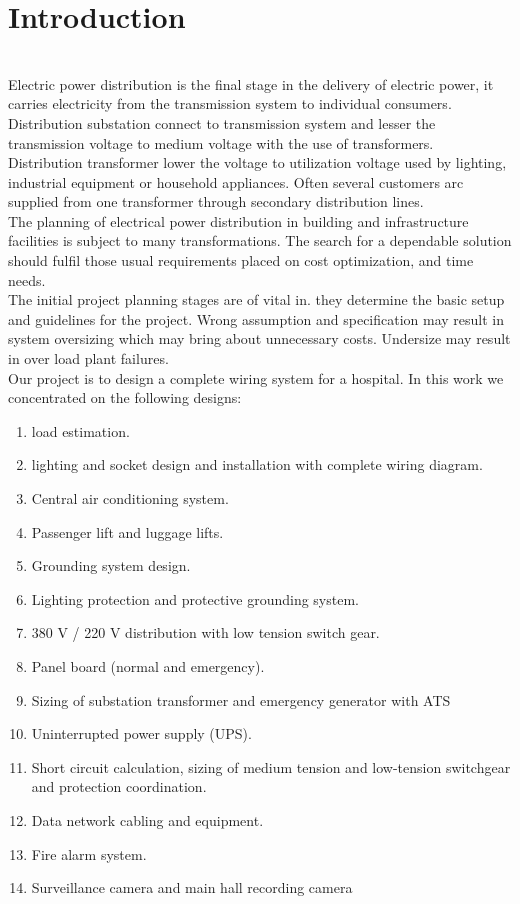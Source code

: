 \documentclass[12pt,fleqn]{book} %
\begin{document}
\section{Introduction}

\\ Electric power distribution is the final stage in the delivery of electric power, it carries electricity  from  the transmission  system  to  individual  consumers. Distribution  substation  connect  to  transmission system and lesser the transmission  voltage to medium voltage with the use of transformers.
\\ Distribution  transformer  lower  the  voltage  to utilization  voltage used by lighting, industrial  equipment  or  household appliances. Often several customers arc supplied from one transformer through secondary distribution lines.
\\ The planning   of  electrical  power distribution  in  building and infrastructure facilities is subject to many transformations. The search  for  a dependable  solution  should  fulfil those usual requirements placed on cost optimization, and time needs.
\\The initial project planning stages are of vital in. they determine the basic  setup  and  guidelines  for the project. Wrong assumption  and  specification  may result  in system  oversizing  which  may bring  about unnecessary costs. Undersize may result in over load plant failures.
\\Our project is to design a complete wiring system for a hospital. In this work  we concentrated on the following designs:
\begin{enumerate}
    \item load estimation.
    \item lighting and socket design and installation with complete wiring diagram.
    \item Central air conditioning system.
    \item Passenger lift and luggage lifts.
    \item Grounding system design.
    \item Lighting protection and protective grounding system.
    \item 380 V / 220 V distribution with low tension switch gear.
    \item Panel board (normal and emergency).
    \item 	Sizing of substation transformer and emergency generator with ATS
    \item Uninterrupted power supply (UPS).
    \item Short circuit calculation, sizing of medium tension and low-tension switchgear and protection coordination.
    \item Data network cabling and equipment.
    	\item Fire alarm system.
    	\item Surveillance camera and main hall recording camera

\end{enumerate}
\end{document}
